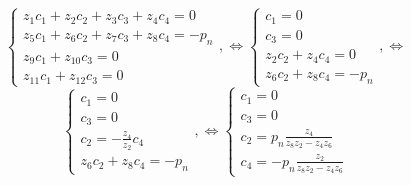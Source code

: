 \begin{equation*}
    \begin{cases}
        z_1 c_1 + z_2 c_2 + z_3 c_3 + z_4 c_4 = 0 \\
        z_5 c_1 + z_6 c_2 + z_7 c_3 + z_8 c_4 = -p_n \\
        z_9 c_1 + z_{10} c_3 = 0 \\
        z_{11} c_1 + z_{12} c_3 = 0
    \end{cases}, \Leftrightarrow 
    \begin{cases}
        c_1 = 0 \\
        c_3 = 0 \\
        z_2 c_2 + z_4 c_4 = 0 \\
        z_6 c_2 + z_8 c_4 = -p_n
    \end{cases}, \Leftrightarrow 
\end{equation*}
\begin{equation*}
    \begin{cases}
        c_1 = 0 \\
        c_3 = 0 \\
        c_2 = - \frac{z_4}{z_2} c_4 \\
        z_6 c_2 + z_8 c_4 = -p_n
    \end{cases}, \Leftrightarrow 
    \begin{cases}
        c_1 = 0 \\
        c_3 = 0 \\
        c_2 = p_n \frac{z_4}{z_8 z_2 - z_4 z_6} \\
        c_4 = -p_n \frac{z_2}{z_8 z_2 - z_4 z_6}
    \end{cases}
\end{equation*}
